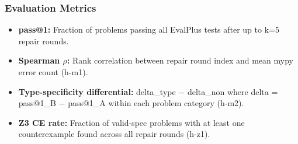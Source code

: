 \subsubsection{Evaluation Metrics}

\begin{itemize}
\item \textbf{pass@1:} Fraction of problems passing all EvalPlus tests after up to k=5 repair rounds.
\item \textbf{Spearman $\rho$:} Rank correlation between repair round index and mean mypy error count (h-m1).
\item \textbf{Type-specificity differential:} delta\_type $-$ delta\_non where delta = pass@1\_B $-$ pass@1\_A within each problem category (h-m2).
\item \textbf{Z3 CE rate:} Fraction of valid-spec problems with at least one counterexample found across all repair rounds (h-z1).
\end{itemize}

